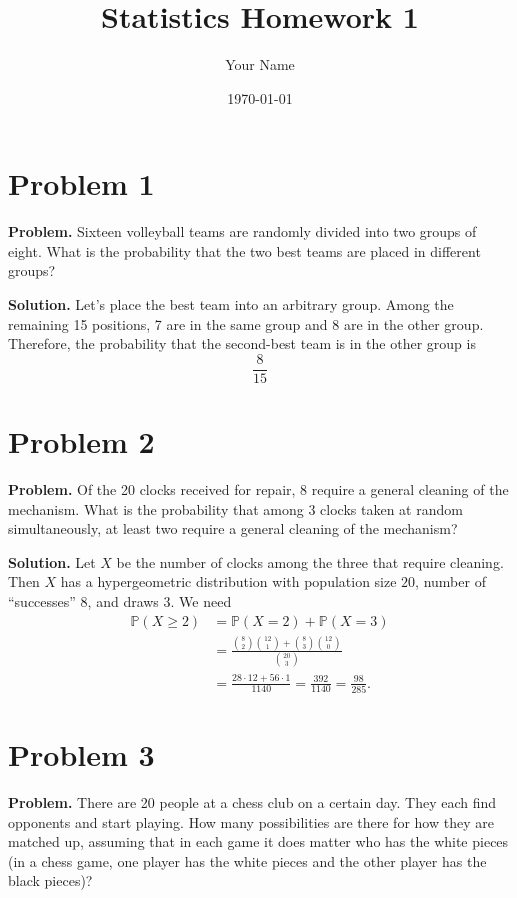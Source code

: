 \documentclass{article}
\title{Statistics Homework 1}
\author{Your Name}
\date{\today}
\begin{document}
\maketitle

\section{Problem 1}

\textbf{Problem.} Sixteen volleyball teams are randomly divided into two groups of eight. What is the probability that the two best teams are placed in different groups?

\textbf{Solution.} Let's place the best team into an arbitrary group. Among the remaining 15 positions, 7 are in the same group and 8 are in the other group. Therefore, the probability that the second-best team is in the other group is
\[
\frac{8}{15}
\]
\section{Problem 2}

\textbf{Problem.} Of the 20 clocks received for repair, 8 require a general cleaning of the mechanism. What is the probability that among 3 clocks taken at random simultaneously, at least two require a general cleaning of the mechanism?

\textbf{Solution.} Let $X$ be the number of clocks among the three that require cleaning. Then $X$ has a hypergeometric distribution with population size $20$, number of ``successes'' $8$, and draws $3$. We need
\begin{align*}
\mathbb{P}(X \ge 2) &= \mathbb{P}(X=2) + \mathbb{P}(X=3) \\
&= \frac{\binom{8}{2}\binom{12}{1} + \binom{8}{3}\binom{12}{0}}{\binom{20}{3}} \\
&= \frac{28\cdot 12 + 56\cdot 1}{1140} = \frac{392}{1140} = \frac{98}{285}.
\end{align*}
\section{Problem 3}

\textbf{Problem.} There are 20 people at a chess club on a certain day. They each find opponents and start playing. How many possibilities are there for how they are matched up, assuming that in each game it does matter who has the white pieces (in a chess game, one player has the white pieces and the other player has the black pieces)?
\end{document}
